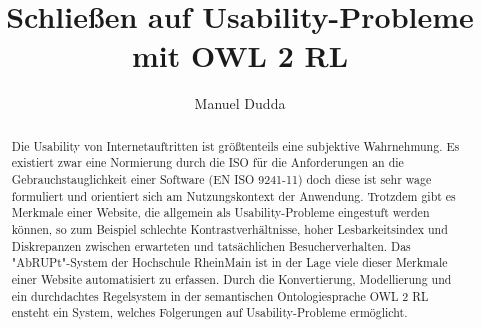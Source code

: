 \documentclass[runningheads,a4paper]{llncs}
\begin{document}
\mainmatter  %

\title{Schließen auf Usability-Probleme mit OWL 2 RL}


%
%
\author{Manuel Dudda}
%


%
%

\maketitle


\begin{abstract}
Die Usability von Internetauftritten ist größtenteils eine subjektive Wahrnehmung. 
Es existiert zwar eine Normierung durch die ISO für die Anforderungen an die Gebrauchstauglichkeit einer Software (EN ISO 9241-11) doch diese ist sehr wage formuliert und orientiert sich am Nutzungskontext der Anwendung.
Trotzdem gibt es Merkmale einer Website, die allgemein als Usability-Probleme eingestuft werden können, so zum Beispiel schlechte Kontrastverhältnisse, hoher Lesbarkeitsindex und Diskrepanzen zwischen erwarteten und tatsächlichen Besucherverhalten. 
Das "AbRUPt"-System der Hochschule RheinMain ist in der Lage viele dieser Merkmale einer Website automatisiert zu erfassen. 
Durch die Konvertierung, Modellierung und ein durchdachtes Regelsystem in der semantischen Ontologiesprache OWL 2 RL ensteht ein System, welches Folgerungen auf Usability-Probleme ermöglicht.
\end{abstract}
\end{document}
